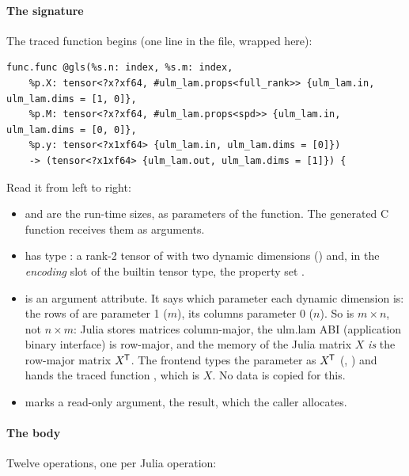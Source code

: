 \paragraph{The signature} The traced function begins (one line in the
file, wrapped here):

\begin{lstlisting}
func.func @gls(%s.n: index, %s.m: index,
    %p.X: tensor<?x?xf64, #ulm_lam.props<full_rank>> {ulm_lam.in, ulm_lam.dims = [1, 0]},
    %p.M: tensor<?x?xf64, #ulm_lam.props<spd>> {ulm_lam.in, ulm_lam.dims = [0, 0]},
    %p.y: tensor<?x1xf64> {ulm_lam.in, ulm_lam.dims = [0]})
    -> (tensor<?x1xf64> {ulm_lam.out, ulm_lam.dims = [1]}) {
\end{lstlisting}

Read it from left to right:
\begin{itemize}
\item {} and  are the run-time sizes, as
   parameters of the function. The generated C function receives
  them as  arguments.
\item {} has type :
  a rank-2 tensor of  with two dynamic dimensions () and,
  in the \emph{encoding} slot of the builtin tensor type, the property set
  .
\item {} is an argument attribute. It says which
   parameter each dynamic dimension is: the rows of 
  are parameter 1 (\(m\)), its columns parameter 0 (\(n\)). So  is
  \(m\times n\), not \(n\times m\): Julia stores matrices column-major, the
  ulm.lam ABI (application binary interface) is row-major, and the memory of
  the Julia matrix \(X\) \emph{is} the row-major matrix \(X^{\mkern-1.5mu\mathsf{T}}\). The frontend
  types the parameter as \(X^{\mkern-1.5mu\mathsf{T}}\) (,
  ) and hands the traced
  function , which is \(X\). No data is copied for this.
\item {} marks a read-only argument,  the
  result, which the caller allocates.
\end{itemize}

\paragraph{The body} Twelve operations, one per Julia operation:

